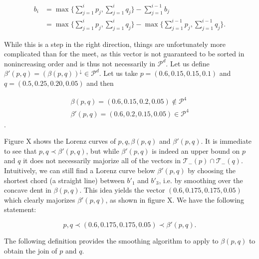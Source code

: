 \begin{align}
    b_i &= \max \Big\{ \sum_{j=1}^{i} p_j , \sum_{j=1}^{i} q_j \Big\} - \sum_{j=1}^{i-1} b_j \\
    &= \max \Big\{ \sum_{j=1}^{i} p_j , \sum_{j=1}^{i} q_j \Big\} - \max \Big\{ \sum_{j=1}^{i-1} p_j , \sum_{j=1}^{i-1} q_j \Big\}.
\end{align}

While this is a step in the right direction, things are unfortunately more complicated than for the meet, as this vector is not guaranteed to be sorted in nonincreasing order and is thus not necessarily in $\mathcal{P}^d$. Let us define $\beta'(p, q) = (\beta(p, q))^\downarrow \in \mathcal{P}^d$. Let us take $p = (0.6, 0.15, 0.15, 0.1)$ and $q = (0.5, 0.25, 0.20, 0.05)$ and then

\begin{align}
    \beta(p, q) = (0.6, 0.15, 0.2, 0.05) \notin \mathcal{P}^4 \\
    \beta'(p, q) = (0.6, 0.2, 0.15, 0.05) \in \mathcal{P}^4
\end{align}. 

Figure X shows the Lorenz curves of $p, q, \beta(p, q)$ and $\beta'(p, q)$. It is immediate to see that $p, q \prec \beta'(p, q)$, but while $\beta'(p, q)$  is indeed an upper bound on $p$ and $q$ it does not necessarily majorize all of the vectors in $\mathcal{T}_-(p) \cap \mathcal{T}_-(q)$. Intuitively, we can still find a Lorenz curve below $\beta'(p, q)$ by choosing the shortest chord (a straight line) between $b'_1$ and $b'_3$, i.e. by smoothing over the concave dent in $\beta(p, q)$. This idea yields the vector $(0.6, 0.175, 0.175, 0.05)$ which clearly majorizes $\beta'(p, q)$, as shown in figure X. We have the following statement:

\begin{equation}
    p, q \prec (0.6, 0.175, 0.175, 0.05) \prec \beta'(p, q).
\end{equation}

The following definition provides the smoothing algorithm to apply to $\beta(p, q)$ to obtain the join of $p$ and $q$.

